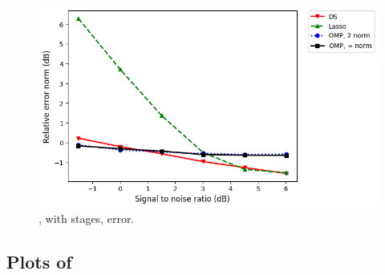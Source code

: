 %
\begin {figure} [H]
\includegraphics [width = \textwidth] {error-big-more-tall-six-usual.png}
\caption {, with  stages, error.}
\end {figure}

\subsection {Plots of }

